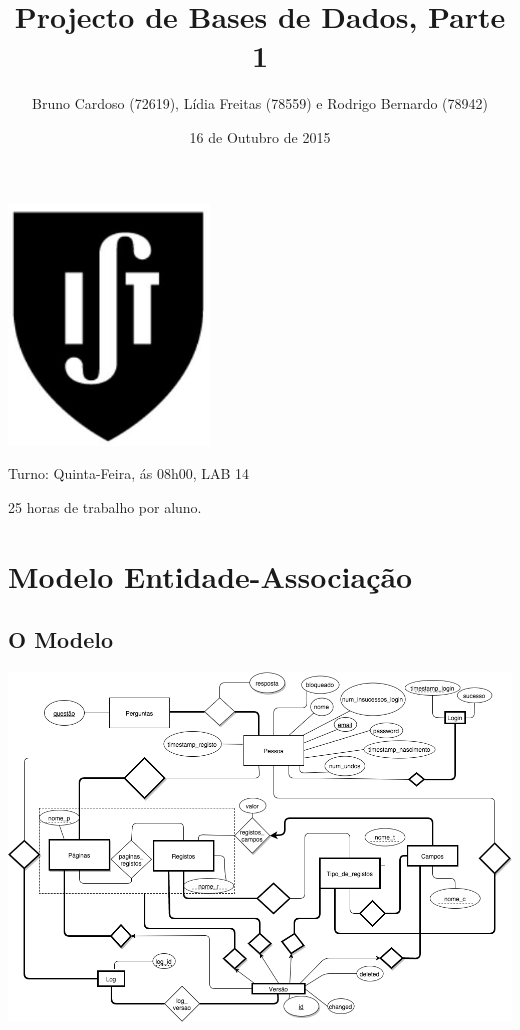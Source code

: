 \documentclass[11pt,a4paper]{article}
\title{\textbf{Projecto de Bases de Dados, Parte 1}}
\author{Bruno Cardoso (72619), Lídia Freitas (78559) e Rodrigo Bernardo (78942)
}
\affil{Instituto Superior T\'{e}cnico}
\begin{document}
\date{16 de Outubro de 2015}

\maketitle

\centerline{\includegraphics[width=0.4\textwidth]{ist-simbolo.jpg}}

\begin{description}[noitemsep]
	\item {}
	\item Turno: Quinta-Feira, ás 08h00, LAB 14
	\item 25 horas de trabalho por aluno.
\end{description}


\newpage

\tableofcontents
\newpage

\section{Modelo Entidade-Associa\c{c}\~ao}
\subsection{O Modelo}

\centerline{\includegraphics[width=1.0\textwidth]{modelo-ea-2.png}}
\end{document}
